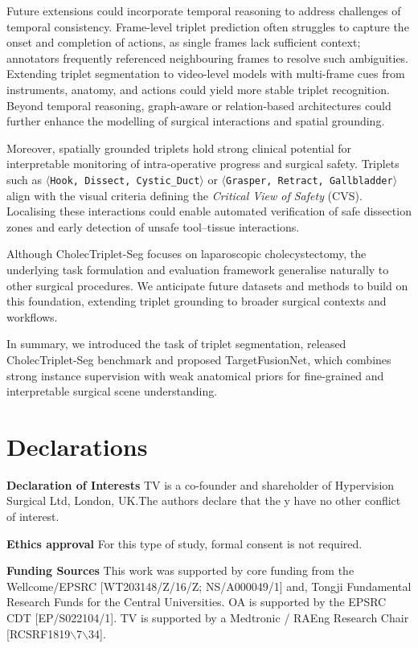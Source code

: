 \documentclass[pdflatex,sn-mathphys-num]{sn-jnl}%
\newcommand{\triplet}[3]{\texttt{$\langle$#1, #2, #3$\rangle$}\xspace}
\theoremstyle{thmstyleone}%
\theoremstyle{thmstyletwo}%
\theoremstyle{thmstylethree}%
\begin{document}
Future extensions could incorporate temporal reasoning to address challenges of temporal consistency.
Frame-level triplet prediction often struggles to capture the onset and completion of actions, as single frames lack sufficient context; annotators frequently referenced neighbouring frames to resolve such ambiguities.
Extending triplet segmentation to video-level models with multi-frame cues from instruments, anatomy, and actions could yield more stable triplet recognition.
Beyond temporal reasoning, graph-aware or relation-based architectures could further enhance the modelling of surgical interactions and spatial grounding.


Moreover, spatially grounded triplets hold strong clinical potential for interpretable monitoring of intra-operative progress and surgical safety.
Triplets such as \triplet{Hook}{Dissect}{Cystic\_Duct} or \triplet{Grasper}{Retract}{Gallbladder} align with the visual criteria defining the \emph{Critical View of Safety} (CVS).
Localising these interactions could enable automated verification of safe dissection zones and early detection of unsafe tool–tissue interactions.


Although CholecTriplet-Seg focuses on laparoscopic cholecystectomy, the underlying task formulation and evaluation framework generalise naturally to other surgical procedures.
We anticipate future datasets and methods to build on this foundation, extending triplet grounding to broader surgical contexts and workflows.

In summary, we introduced the task of triplet segmentation, released CholecTriplet-Seg benchmark and proposed TargetFusionNet, which combines strong instance supervision with weak anatomical priors for fine-grained and interpretable surgical scene understanding.





\section*{Declarations}
\noindent\textbf{Declaration of Interests} 
TV is a co-founder and shareholder of Hypervision Surgical Ltd, London, UK.The authors declare that the y have no other conflict of interest.

\noindent\textbf{Ethics approval} For this type of study, formal consent is not required.

\noindent\textbf{Funding Sources} This work was supported by core funding from the Wellcome/EPSRC [WT203148/Z/16/Z; NS/A000049/1] and, Tongji Fundamental Research Funds for the Central Universities. OA is supported by the EPSRC CDT
[EP/S022104/1].
TV is supported by a Medtronic / RAEng Research Chair [RCSRF1819$\backslash$7$\backslash$34].

\end{document}
